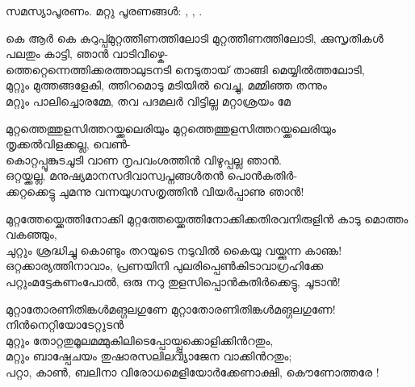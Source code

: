 \begin{enumerate}


സമസ്യാപൂരണം. മറ്റു പൂരണങ്ങൾ: , , .


\begin{slokam}{\VSr}{കെ ആർ കെ കുറുപ്പ്}{മുറ്റത്തീണത്തിലോടി}
മുറ്റത്തീണത്തിലോടി, ക്കുസൃതികള്‍ പലതും കാട്ടി, ഞാൻ വാടിവീഴ്കെ-\\
ത്തെറ്റെന്നെത്തിക്കരത്താലുടനടി നെടുതായ്‌ താങ്ങി മെയ്യിൽത്തലോടി,\\
മുറ്റും മുത്തങ്ങളേകി, ത്തിറമൊടു മടിയിൽ വെച്ചു, മമ്മിഞ്ഞ തന്നും\\
മറ്റും പാലിച്ചൊരമ്മേ, തവ പദമലർ വിട്ടില്ല മറ്റാശ്രയം മേ
\end{slokam}


\begin{slokam}{\VSv}{\VRV}{മുറ്റത്തെത്തുളസിത്തറയ്ക്കലെരിയും}
മുറ്റത്തെത്തുളസിത്തറയ്ക്കലെരിയും തൃക്കല്‍വിളക്കല്ല, വെണ്‍- \\
കൊറ്റപ്പൂങ്കുടചൂടി വാണ നൃപവംശത്തിന്‍ വിഴുപ്പല്ല ഞാന്‍. \\
ഒറ്റയ്ക്കല്ല, മനുഷ്യമാനസദിവാസ്വപ്നങ്ങള്‍തന്‍ പൊന്‍കതിര്‍- \\
ക്കറ്റക്കെട്ടു ചുമന്നു വന്നയുഗസതൃത്തിന്‍ വിയര്‍പ്പാണു ഞാന്‍! 
\end{slokam}



\begin{slokam}{\VSr}{\HM}{മുറ്റത്തേയ്ക്കെത്തിനോക്കി}
മുറ്റത്തേയ്ക്കെത്തിനോക്കിക്കതിരവനിരുളിൻ കാടു മൊത്തം വകഞ്ഞും,\\
ചുറ്റും ശ്രദ്ധിച്ചു കൊണ്ടും തറയുടെ നടുവിൽ കൈയു വയ്ക്കുന്ന കാണ്ക!\\
ഒറ്റക്കാര്യത്തിനാവാം, പ്രണയിനി പുലരിപ്പെൺകിടാവാഗ്രഹിക്കേ\\
പറ്റുംമട്ടേകണംപോൽ, ഒരു നറു തുളസിപ്പൊൻകതിർക്കെട്ടു, ചൂടാൻ!
\end{slokam}



\begin{slokam}{\VSv}{\Unk}{മുറ്റാതോരണിതിങ്കൾമങ്ഗലഗുണേ}
മുറ്റാതോരണിതിങ്കൾമങ്ഗലഗുണേ! നിൻനെറ്റിയോടേറ്റുടൻ\\
മുറ്റും തോറ്റതുമൂലമമ്മുകിലിടെപ്പോയ്പ്പുക്കൊളിക്കിൻറതും,\\
മറ്റും ബാഷ്പേചയം തുഷാരസലിലവ്യാജേന വാക്കിൻറതും;\\
പറ്റാ, കാൺ, ബലിനാ വിരോധമെളിയോർക്കേണാക്ഷി, കൌണോത്തരേ !
\end{slokam}


\end{enumerate}
